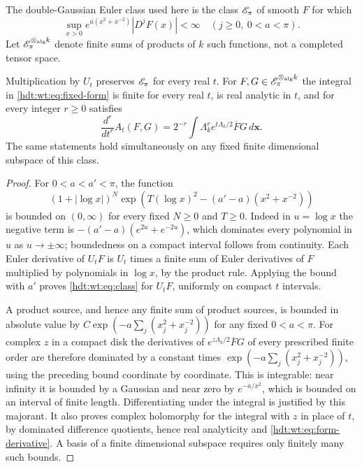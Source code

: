 The double-Gaussian Euler class used here is the class $\mathscr E_\pi$
of smooth $F$ for which
\begin{equation}\label{hdt:wt:eq:class}
 \sup_{x>0}e^{a(x^2+x^{-2})}|D^jF(x)|<\infty
 \quad(j\geq0,\ 0<a<\pi).
\end{equation}
Let $\mathscr E_\pi^{\otimes_{\mathrm{alg}} k}$ denote finite sums of
products of $k$ such functions, not a completed tensor space.

\begin{hdtlemma}
\label{hdt:wt:lem:domination}
Multiplication by $U_t$ preserves $\mathscr E_\pi$ for every real $t$.
For $F,G\in\mathscr E_\pi^{\otimes_{\mathrm{alg}} k}$ the integral
in \eqref{hdt:wt:eq:fixed-form} is finite for every real $t$, is
real analytic in $t$, and for every integer $r\geq0$ satisfies
\begin{equation}\label{hdt:wt:eq:form-derivative}
 \frac{d^r}{dt^r}A_t(F,G)
 =2^{-r}\int\Lambda_k^r e^{t\Lambda_k/2}\overline F G\,d\mathbf x.
\end{equation}
The same statements hold simultaneously on any fixed finite
dimensional subspace of this class.
\end{hdtlemma}

\begin{proof}
For $0<a<a'<\pi$, the function
\[
 (1+|\log x|)^N
 \exp\!\left(T(\log x)^2-(a'-a)(x^2+x^{-2})\right)
\]
is bounded on $(0,\infty)$ for every fixed $N\geq0$ and $T\geq0$.
Indeed in $u=\log x$ the negative term is
$-(a'-a)(e^{2u}+e^{-2u})$, which dominates every polynomial
in $u$ as $u\to\pm\infty$; boundedness on a compact interval
follows from continuity.  Each Euler derivative of $U_tF$ is
$U_t$ times a finite sum of Euler derivatives of $F$ multiplied
by polynomials in $\log x$, by the product rule.  Applying the
bound with $a'$ proves \eqref{hdt:wt:eq:class} for $U_tF$, uniformly
on compact $t$ intervals.

A product source, and hence any finite sum of product sources,
is bounded in absolute value by
$C\exp(-a\sum_j(x_j^2+x_j^{-2}))$ for any fixed $0<a<\pi$.
For complex $z$ in a compact disk the derivatives of
$e^{z\Lambda_k/2}\overline F G$ of every prescribed finite
order are therefore dominated by a constant times
$\exp(-a\sum_j(x_j^2+x_j^{-2}))$, using the preceding bound
coordinate by coordinate.  This is integrable: near infinity
it is bounded by a Gaussian and near zero by $e^{-a/x^2}$,
which is bounded on an interval of finite length.  Differentiating
under the integral is justified by this majorant.  It also proves
complex holomorphy for the integral with $z$ in place of $t$,
by dominated difference quotients, hence real analyticity and
\eqref{hdt:wt:eq:form-derivative}.  A basis of a finite dimensional
subspace requires only finitely many such bounds.
\end{proof}

